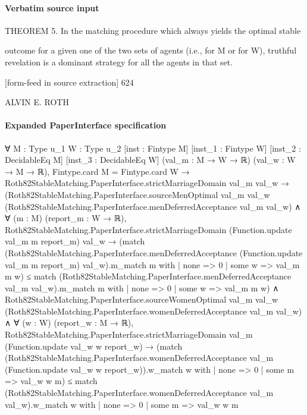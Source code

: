 \documentclass[10pt]{article}
\begin{document}
\paragraph{Verbatim source input}
\begin{ReviewVerbatim}
THEOREM 5. In the matching procedure which always yields the optimal stable

outcome for a given one of the two sets of agents (i.e., for M or for W), truthful revelation
is a dominant strategy for all the agents in that set.


[form-feed in source extraction]
624

ALVIN E. ROTH
\end{ReviewVerbatim}


\paragraph{Expanded PaperInterface specification}
\begin{ReviewVerbatim}
∀ {M : Type u_1} {W : Type u_2} [inst : Fintype M] [inst_1 : Fintype W] [inst_2 : DecidableEq M]
  [inst_3 : DecidableEq W] (val_m : M → W → ℝ) (val_w : W → M → ℝ),
  Fintype.card M = Fintype.card W →
    Roth82StableMatching.PaperInterface.strictMarriageDomain val_m val_w →
      (Roth82StableMatching.PaperInterface.sourceMenOptimal val_m val_w
            (Roth82StableMatching.PaperInterface.menDeferredAcceptance val_m val_w) ∧
          ∀ (m : M) (report_m : W → ℝ),
            Roth82StableMatching.PaperInterface.strictMarriageDomain (Function.update val_m m report_m) val_w →
              (match
                  (Roth82StableMatching.PaperInterface.menDeferredAcceptance (Function.update val_m m report_m)
                        val_w).m_match
                    m with
                | none => 0
                | some w => val_m m w) ≤
                match (Roth82StableMatching.PaperInterface.menDeferredAcceptance val_m val_w).m_match m with
                | none => 0
                | some w => val_m m w) ∧
        Roth82StableMatching.PaperInterface.sourceWomenOptimal val_m val_w
            (Roth82StableMatching.PaperInterface.womenDeferredAcceptance val_m val_w) ∧
          ∀ (w : W) (report_w : M → ℝ),
            Roth82StableMatching.PaperInterface.strictMarriageDomain val_m (Function.update val_w w report_w) →
              (match
                  (Roth82StableMatching.PaperInterface.womenDeferredAcceptance val_m
                        (Function.update val_w w report_w)).w_match
                    w with
                | none => 0
                | some m => val_w w m) ≤
                match (Roth82StableMatching.PaperInterface.womenDeferredAcceptance val_m val_w).w_match w with
                | none => 0
                | some m => val_w w m
\end{ReviewVerbatim}
\end{document}

